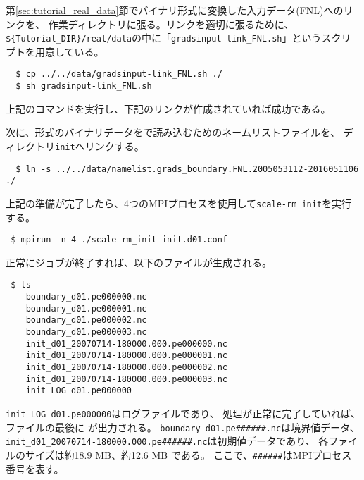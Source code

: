 第\ref{sec:tutorial_real_data}節でバイナリ形式に変換した入力データ(FNL)へのリンクを、
作業ディレクトリに張る。リンクを適切に張るために、\verb|${Tutorial_DIR}/real/data|の中に「\verb|gradsinput-link_FNL.sh|」というスクリプトを用意している。
\begin{verbatim}
  $ cp ../../data/gradsinput-link_FNL.sh ./
  $ sh gradsinput-link_FNL.sh
\end{verbatim}
上記のコマンドを実行し、下記のリンクが作成されていれば成功である。

次に、{\grads}形式のバイナリデータを{\scalelib}で読み込むためのネームリストファイルを、
ディレクトリ\verb|init|へリンクする。
\begin{verbatim}
  $ ln -s ../../data/namelist.grads_boundary.FNL.2005053112-2016051106 ./
\end{verbatim}
%
上記の準備が完了したら、4つのMPIプロセスを使用して\verb|scale-rm_init|を実行する。
\begin{verbatim}
 $ mpirun -n 4 ./scale-rm_init init.d01.conf
\end{verbatim}

正常にジョブが終了すれば、以下のファイルが生成される。
\begin{verbatim}
 $ ls
    boundary_d01.pe000000.nc
    boundary_d01.pe000001.nc
    boundary_d01.pe000002.nc
    boundary_d01.pe000003.nc
    init_d01_20070714-180000.000.pe000000.nc
    init_d01_20070714-180000.000.pe000001.nc
    init_d01_20070714-180000.000.pe000002.nc
    init_d01_20070714-180000.000.pe000003.nc
    init_LOG_d01.pe000000
\end{verbatim}
\verb|init_LOG_d01.pe000000|はログファイルであり、
処理が正常に完了していれば、ファイルの最後に
が出力される。
\verb|boundary_d01.pe######.nc|は境界値データ、
\verb|init_d01_20070714-180000.000.pe######.nc|は初期値データであり、
各ファイルのサイズは約18.9 MB、約12.6 MB である。
ここで、\verb|######|はMPIプロセス番号を表す。\\

